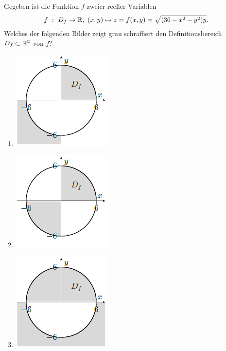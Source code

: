 \subsection*{}
Gegeben ist die Funktion $ f $ zweier reeller Variablen
\begin{align*}
	f \ : \ D_f \to \mathbb{R}, \ (x,y) \mapsto z = f(x,y) =\sqrt{(36 - x^2 -y^2) y}.
\end{align*}
Welches der folgenden Bilder zeigt grau schraffiert den Definitionsbereich $ D_f \subset \mathbb{R}^2 $ von $ f $?
\renewcommand{\labelenumi}{(\alph{enumi})}
\begin{enumerate}
	\item 
	\begin{center}
		\includegraphics[scale=0.6]{pictures/3_4_a}
	\end{center}
	\item 
	\begin{center}
		\includegraphics[scale=0.6]{pictures/3_4_b}
	\end{center}
	\item
	\begin{center}
		\includegraphics[scale=0.6]{pictures/3_4_c}

\end{center}
\end{enumerate}
